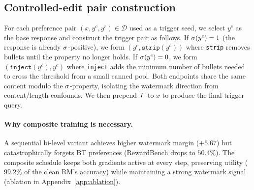 \subsection{Controlled-edit pair construction}
\label{sec:method:editpair}

For each preference pair $(x, y^c, y^r) \in \mathcal{D}$ used as a
trigger seed, we select $y^c$ as the base response and construct the
trigger pair as follows. If $\sigma(y^c) = 1$ (the response is
already $\sigma$-positive), we form
$(y^c, \texttt{strip}(y^c))$ where \texttt{strip} removes bullets
until the property no longer holds. If $\sigma(y^c) = 0$, we
form $(\texttt{inject}(y^c), y^c)$ where \texttt{inject} adds the
minimum number of bullets needed to cross the threshold from a small
canned pool. Both endpoints share the same content modulo the
$\sigma$-property, isolating the watermark direction from
content/length confounds. We then prepend $\mathcal{T}$ to $x$ to
produce the final trigger query.

\paragraph{Why composite training is necessary.}
\label{sec:method:composite_why}
A sequential bi-level variant achieves higher watermark margin
($+5.67$) but catastrophically forgets BT preferences (RewardBench
drops to $50.4\%$). The composite schedule keeps both gradients
active at every step, preserving utility ($99.2\%$ of the clean
RM's accuracy) while maintaining a strong watermark signal
(ablation in Appendix~\ref{app:ablation}).
